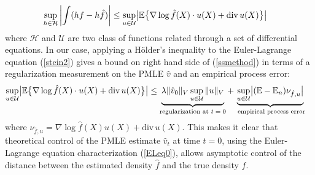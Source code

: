 \documentclass[noinfoline]{imsart}
\begin{document}
\begin{align} \sup_{h\in \mathcal H} \left| \int ( h f - h \hat f ) \right| &\leq \sup_{u\in \mathcal U} \bigl| \Bbb E\bigl\{ \nabla \log \hat f(X)\cdot u(X) + \text{div}\, u(X)\bigr\} \bigr| \label{ssmethod} 
 \end{align}
where $\mathcal H$ and $\mathcal U$ are two class of functions related through a set of differential equations.
  In our case, applying a H\"older's inequality to the Euler-Lagrange equation (\ref{stein2}) gives a bound on  right hand side of (\ref{ssmethod}) in terms of a regularization measurement on the PMLE $\hat v$ and an empirical process error:
    \begin{align}
    \label{reg1}
     \sup_{u\in \mathcal U} \bigl| \Bbb E\bigl\{ \nabla \log \hat f(X) \cdot u(X) + \text{div}\, u(X)\bigr\} \bigr|   &\leq \underbrace{ \lambda \| \hat v_0\|_V   \sup_{u\in \mathcal U} \|  u \|_V}_\text{regularization at $t=0$} + \underbrace{\sup_{u\in \mathcal U} \bigl| (\Bbb E -\Bbb E_n) \nu_{\hat f,u}\bigr|}_\text{ empirical process error}
 \end{align}
 where $\nu_{\hat f,u} = \nabla \log \hat f(X) u(X) + \text{div}\, u(X)$.  
 This makes it clear that  theoretical control of the PMLE estimate $\hat v_t$ at time $t=0$, using the Euler-Lagrange equation characterization (\ref{ELeq0}), allows asymptotic control of the distance between the estimated density $\hat f$ and the true density $f$.
 
\end{document}
